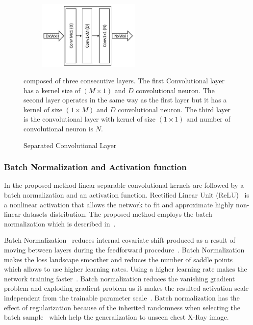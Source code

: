 \begin{figure}
    \begin{center}
    \includegraphics[height=34mm,width=7.0cm]{Figures/fig3.jpg}
    \caption{Separated Convolutional Layer}{ composed of three consecutive layers. The first Convolutional layer has a kernel size of $(M\times1)$ and $D$  convolutional neuron. The second layer  operates in the same way as the first layer but it has a kernel of size $(1\times M)$ and $D$ convolutional neuron. The third layer is the convolutional layer with kernel of size $(1\times1)$ and number of convolutional neuron is $N$.}
    \label{fig3}
    \end{center}
    \end{figure}

\subsubsection{ Batch Normalization and  Activation function}

In the proposed method linear separable convolutional kernels are followed by a batch normalization and an activation function. Rectified Linear Unit (ReLU)~\cite{he2015delving} is a nonlinear activation that allows the network to fit and approximate highly non-linear datasets distribution. The proposed method employs the batch normalization which is described in~\cite{ioffe2015batch}. 

Batch Normalization~\cite{ioffe2015batch} reduces internal covariate shift produced as a result of  moving between layers during the feedforward procedure~\cite{ioffe2015batch}. Batch Normalization makes the loss landscape smoother and reduces the number of saddle points~\cite{santurkar2018does} which allows to use higher learning rates. Using a higher learning rate makes the network training  faster~\cite{ioffe2015batch}. Batch normalization reduces the vanishing gradient problem and exploding gradient problem as it makes the resulted activation scale independent from the trainable parameter scale~\cite{ioffe2015batch}. Batch normalization has the effect of regularization because of the inherited randomness when selecting the batch sample~\cite{ioffe2015batch} which help the generalization to unseen chest X-Ray image.

